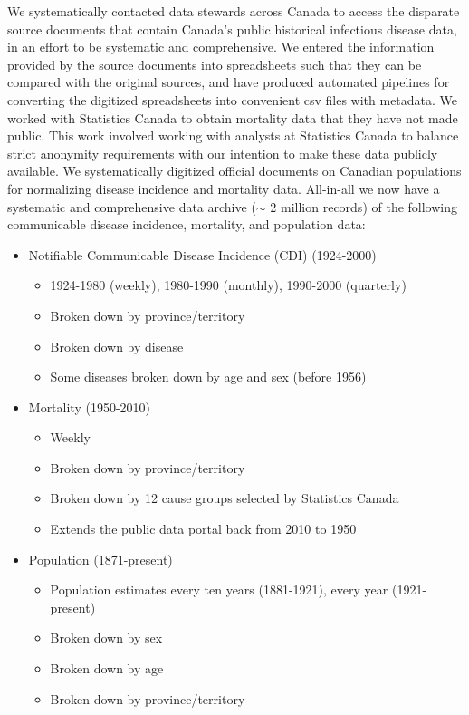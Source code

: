 We systematically contacted data stewards across Canada to access the disparate source documents that contain Canada's public historical infectious disease data, in an effort to be systematic and comprehensive. We entered the information provided by the source documents into spreadsheets such that they can be compared with the original sources, and have produced automated pipelines for converting the digitized spreadsheets into convenient csv files with metadata. We worked with Statistics Canada to obtain mortality data that they have not made public. This work involved working with analysts at Statistics Canada to balance strict anonymity requirements with our intention to make these data publicly available. We systematically digitized official documents on Canadian populations for normalizing disease incidence and mortality data. All-in-all we now have a systematic and comprehensive data archive ($\sim$ 2 million records) of the following communicable disease incidence, mortality, and population data:
\begin{itemize}
  \item Notifiable Communicable Disease Incidence (CDI) (1924-2000)
    \begin{itemize}
      \item 1924-1980 (weekly), 1980-1990 (monthly), 1990-2000 (quarterly)
      \item Broken down by province/territory
      \item Broken down by disease
      \item Some diseases broken down by age and sex (before 1956)
    \end{itemize}
  \item Mortality (1950-2010)
    \begin{itemize}
      \item Weekly
      \item Broken down by province/territory
      \item Broken down by 12 cause groups selected by Statistics Canada
      \item Extends the public data portal back from 2010 to 1950
    \end{itemize}
  \item Population (1871-present)
    \begin{itemize}
      \item Population estimates every ten years (1881-1921), every year (1921-present)
      \item Broken down by sex
      \item Broken down by age
      \item Broken down by province/territory
    \end{itemize}
\end{itemize}

